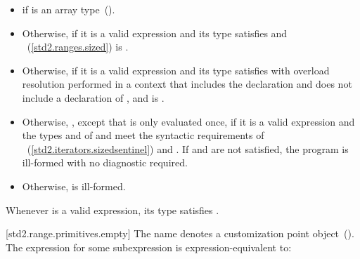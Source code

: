 \begin{itemize}
\item
   if  is an array
  type~().

\item
  Otherwise,  if it is a valid expression and its type 
  satisfies  and
  ~(\ref{std2.ranges.sized}) is
  .

\item
  Otherwise,  if it is a valid expression and its type 
  satisfies  with overload resolution
  performed in a context that includes the declaration
   and does not include
  a declaration of , and
   is .

\item
  Otherwise,
  , except that 
  is only evaluated once, if it is a valid expression and the types  and  of
   and  meet the
  syntactic requirements of
  ~(\ref{std2.iterators.sizedsentinel}) and
  . If  and
   are not satisfied, the program is ill-formed with no
  diagnostic required.

\item
  Otherwise,  is ill-formed.
\end{itemize}

\pnum
\enternote Whenever  is a valid expression, its
type satisfies . \exitnote

[std2.range.primitives.empty]{}
\pnum
The name  denotes a customization point
object~(). The expression
 for some subexpression  is
expression-equivalent to:

